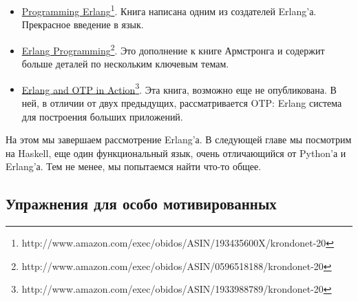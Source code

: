 \begin{itemize}

\item \href{http://www.amazon.com/exec/obidos/ASIN/193435600X/krondonet-20}{Programming Erlang}\footnote[1]{http://www.amazon.com/exec/obidos/ASIN/193435600X/krondonet-20}. Книга написана одним из создателей Erlang'а. 
Прекрасное введение в язык.

\item \href{http://www.amazon.com/exec/obidos/ASIN/0596518188/krondonet-20}{Erlang Programming}\footnote[2]{http://www.amazon.com/exec/obidos/ASIN/0596518188/krondonet-20}. Это дополнение к книге Армстронга и 
содержит больше деталей по нескольким ключевым темам. 

\item \href{http://www.amazon.com/exec/obidos/ASIN/1933988789/krondonet-20}{Erlang and OTP in Action}\footnote[3]{http://www.amazon.com/exec/obidos/ASIN/1933988789/krondonet-20}. Эта книга, возможно еще не опубликована. В ней, в отличии 
от двух предыдущих, рассматривается OTP: Erlang система для построения больших приложений.

\end{itemize}


На этом мы завершаем рассмотрение Erlang'а. В следующей главе мы 
посмотрим на Haskell, еще один функциональный язык, очень отличающийся 
от Python'а и Erlang'а. Тем не менее, мы попытаемся найти что-то общее.


\subsection{Упражнения для особо мотивированных}

